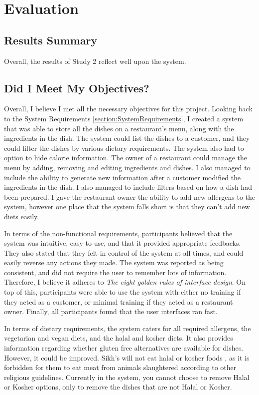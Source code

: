 \chapter{Evaluation}
\label{section:Evaluation}

\section{Results Summary}

Overall, the results of Study 2 reflect well upon the system.


\section{Did I Meet My Objectives?}

Overall, I believe I met all the necessary objectives for this project. Looking back to the System Requirements \ref{section:SystemRequirements}, I created a system that was able to store all the dishes on a restaurant's menu, along with the ingredients in the dish. The system could list the dishes to a customer, and they could filter the dishes by various dietary requirements. The system also had to option to hide calorie information. The owner of a restaurant could manage the menu by adding, removing and editing ingredients and dishes. I also managed to include the ability to generate new information after a customer modified the ingredients in the dish. I also managed to include filters based on how a dish had been prepared. I gave the restaurant owner the ability to add new allergens to the system, however one place that the system falls short is that they can't add new diets easily.

In terms of the non-functional requirements, participants believed that the system was intuitive, easy to use, and that it provided appropriate feedbacks. They also stated that they felt in control of the system at all times, and could easily reverse any actions they made. The system was reported as being consistent, and did not require the user to remember lots of information. Therefore, I believe it adheres to \textit{The eight golden rules of interface design}. On top of this, participants were able to use the system with either no training if they acted as a customer, or minimal training if they acted as a restaurant owner. Finally, all participants found that the user interfaces ran fast.

In terms of dietary requirements, the system caters for all required allergens, the vegetarian and vegan diets, and the halal and kosher diets. It also provides information regarding whether gluten free alternatives are available for dishes. However, it could be improved. Sikh's will not eat halal or kosher foods \cite{guidance_on_foods_for_religious_faiths_2009}, as it is forbidden for them to eat meat from animals slaughtered according to other religious guidelines. Currently in the system, you cannot choose to remove Halal or Kosher options, only to remove the dishes that are not Halal or Kosher.

